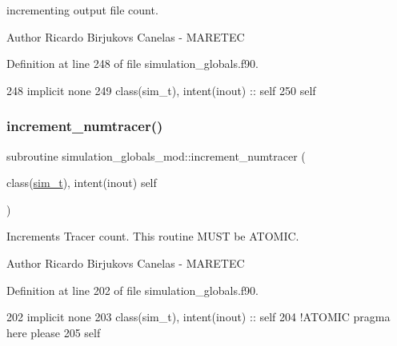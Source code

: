 incrementing output file count. 

\begin{DoxyAuthor}{Author}
Ricardo Birjukovs Canelas -\/ M\+A\+R\+E\+T\+EC 
\end{DoxyAuthor}


Definition at line 248 of file simulation\+\_\+globals.\+f90.


\begin{DoxyCode}
248     \textcolor{keywordtype}{implicit none}
249     \textcolor{keywordtype}{class}(sim\_t), \textcolor{keywordtype}{intent(inout)} :: self
250     self%
\end{DoxyCode}
\mbox{\label{namespacesimulation__globals__mod_ae9910caa377f4d2875e59c749ee0488c}} 
\subsubsection{\texorpdfstring{increment\+\_\+numtracer()}{increment\_numtracer()}}
{\footnotesize\ttfamily subroutine simulation\+\_\+globals\+\_\+mod\+::increment\+\_\+numtracer (\begin{DoxyParamCaption}\item[{class(\mbox{\hyperlink{structsimulation__globals__mod_1_1sim__t}{sim\+\_\+t}}), intent(inout)}]{self }\end{DoxyParamCaption})\hspace{0.3cm}{\ttfamily [private]}}



Increments Tracer count. This routine M\+U\+ST be A\+T\+O\+M\+IC. 

\begin{DoxyAuthor}{Author}
Ricardo Birjukovs Canelas -\/ M\+A\+R\+E\+T\+EC 
\end{DoxyAuthor}


Definition at line 202 of file simulation\+\_\+globals.\+f90.


\begin{DoxyCode}
202     \textcolor{keywordtype}{implicit none}
203     \textcolor{keywordtype}{class}(sim\_t), \textcolor{keywordtype}{intent(inout)} :: self
204     \textcolor{comment}{!ATOMIC pragma here please}
205     self%
\end{DoxyCode}
\mbox{\label{namespacesimulation__globals__mod_a20ba28d72a9bea823d9373a94f97026e}} 
